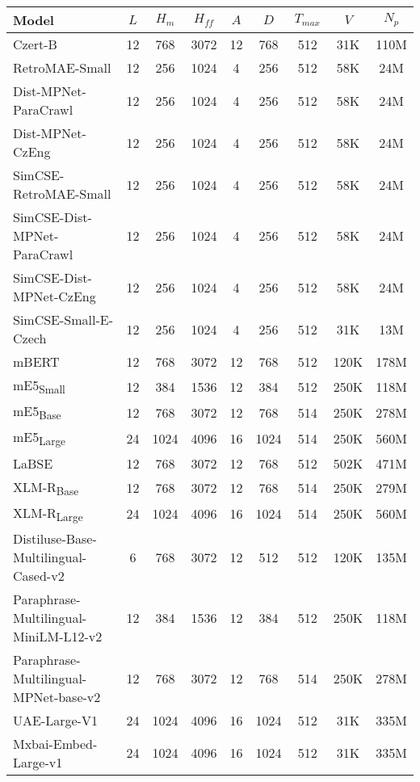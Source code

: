 \begin{table*}[ht!]
    \centering
    \begin{tabular}{lcccccccc}
      \toprule
      \textbf{Model} & $L$ & $H_m$ & $H_{ff}$ & $A$ & $D$ & $T_{max}$ & $V$ & $N_p$ \\
      \midrule
      Czert-B & 12 & 768 & 3072 & 12 & 768 & 512 & 31K & 110M \\
      RetroMAE-Small & 12 & 256 & 1024 & 4 & 256 & 512 & 58K & 24M \\
      Dist-MPNet-ParaCrawl & 12 & 256 & 1024 & 4 & 256 & 512 & 58K & 24M \\
      Dist-MPNet-CzEng & 12 & 256 & 1024 & 4 & 256 & 512 & 58K & 24M \\
      SimCSE-RetroMAE-Small & 12 & 256 & 1024 & 4 & 256 & 512 & 58K & 24M \\
      SimCSE-Dist-MPNet-ParaCrawl & 12 & 256 & 1024 & 4 & 256 & 512 & 58K & 24M \\
      SimCSE-Dist-MPNet-CzEng & 12 & 256 & 1024 & 4 & 256 & 512 & 58K & 24M \\
      SimCSE-Small-E-Czech & 12 & 256 & 1024 & 4 & 256 & 512 & 31K & 13M \\
      mBERT & 12 & 768 & 3072 & 12 & 768 & 512 & 120K & 178M \\
      mE5\textsubscript{Small} & 12 & 384 & 1536 & 12 & 384 & 512 & 250K & 118M \\
      mE5\textsubscript{Base} & 12 & 768 & 3072 & 12 & 768 & 514 & 250K & 278M \\
      mE5\textsubscript{Large} & 24 & 1024 & 4096 & 16 & 1024 & 514 & 250K & 560M \\
      LaBSE & 12 & 768 & 3072 & 12 & 768 & 512 & 502K & 471M \\
      XLM-R\textsubscript{Base} & 12 & 768 & 3072 & 12 & 768 & 514 & 250K & 279M \\
      XLM-R\textsubscript{Large} & 24 & 1024 & 4096 & 16 & 1024 & 514 & 250K & 560M \\
      Distiluse-Base-Multilingual-Cased-v2 & 6 & 768 & 3072 & 12 & 512 & 512 & 120K & 135M \\
      Paraphrase-Multilingual-MiniLM-L12-v2 & 12 & 384 & 1536 & 12 & 384 & 512 & 250K & 118M \\
      Paraphrase-Multilingual-MPNet-base-v2 & 12 & 768 & 3072 & 12 & 768 & 514 & 250K & 278M \\
      UAE-Large-V1 & 24 & 1024 & 4096 & 16 & 1024 & 512 & 31K & 335M \\
      Mxbai-Embed-Large-v1 & 24 & 1024 & 4096 & 16 & 1024 & 512 & 31K & 335M \\

\end{tabular}
\end{table*}
